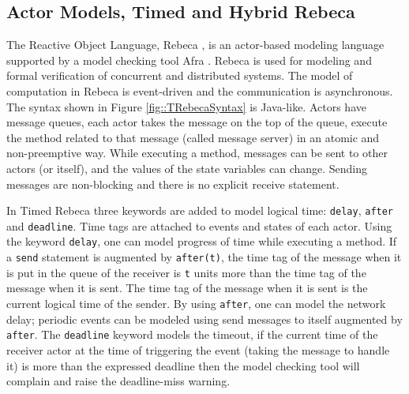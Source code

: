 \documentclass[
graybox,
envcountchap
]{svmult}
\begin{document}
\begin{bibunit}






\subsection{Actor Models,  Timed and Hybrid Rebeca}
The Reactive Object Language, Rebeca \cite{DBLP:journals/fuin/SirjaniMSB04,DBLP:conf/birthday/SirjaniJ11}, is an actor-based \cite{Hewitt:77:Actors,Agha90} modeling language  supported by a model checking tool Afra \cite{Afra}.
Rebeca is used for modeling and formal verification of concurrent and distributed systems.
The model of computation in  Rebeca is event-driven and the communication is asynchronous.
The syntax shown in Figure \ref{fig::TRebecaSyntax} is Java-like. 
Actors have message queues, each actor takes the message on the top of the queue, execute the method related to that message (called message server) in an atomic and non-preemptive way. While executing a method, messages can be sent to other actors (or itself), and the values of the state variables can change. Sending messages are non-blocking and there is no explicit receive statement.

In Timed Rebeca \cite{DBLP:journals/scp/KhamespanahSSKI15,DBLP:conf/birthday/SirjaniK16} three keywords are added to model logical time: \texttt{delay}, \texttt{after} and \texttt{deadline}. Time tags are attached to events and states of each actor. Using the keyword \texttt{delay}, one can model progress of time while executing a method. If a \texttt{send} statement is augmented by \texttt{after(t)},  the time tag  of the message when it is put in the queue of the receiver is \texttt{t} units more than the time tag of the message when it is sent. The time tag of the message when it is sent is the current logical time of the sender. By using \texttt{after}, one can model the network delay; periodic events can be modeled using send messages to itself augmented by  \texttt{after}.
The \texttt{deadline} keyword models the timeout, if the current time of the receiver actor at the time of triggering the event (taking the message to handle it) is more than the expressed deadline then the model checking tool will complain and raise the deadline-miss warning.


\end{bibunit}
\end{document}
